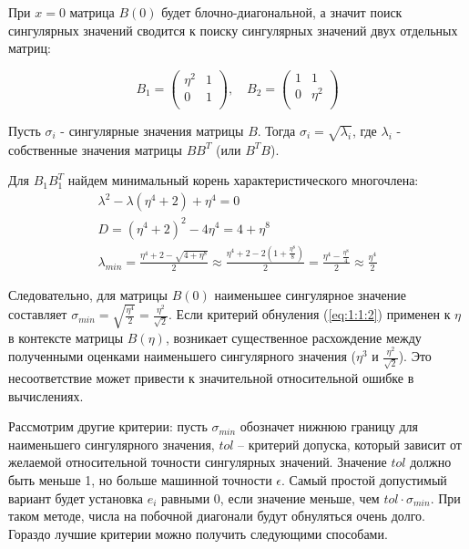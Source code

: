 При $x=0$ матрица $B(0)$ будет блочно-диагональной, а значит поиск сингулярных значений сводится к поиску сингулярных значений двух отдельных матриц:

\begin{equation*}
B_1=\begin{pmatrix}
\eta^2&1\\
0&1\\
\end{pmatrix},
\quad
B_2=\begin{pmatrix}
1&1\\
0&\eta^2\\
\end{pmatrix}
\end{equation*}

\begin{note}
    Пусть $\sigma_i$ - сингулярные значения матрицы $B$. Тогда $\sigma_i = \sqrt{\lambda_i}$, где $\lambda_i$ - собственные значения матрицы $BB^T$ (или $B^TB$). 
\end{note}

Для $B_1B_1^T$ найдем минимальный корень характеристического многочлена:
\begin{equation*}
\begin{gathered}
\lambda^2-\lambda(\eta^4+2)+\eta^4=0 \\
D = (\eta^4+2)^2-4\eta^4 = 4+\eta^8 \\
\lambda_{min} = \frac{\eta^4+2-\sqrt{4+\eta^8}}{2}
\approx \frac{\eta^4+2-2(1+\frac{\eta^8}{8})}{2} = \frac{\eta^4-\frac{\eta^8}{4}}{2} \approx \frac{\eta^4}{2}
\end{gathered}
\end{equation*}

Следовательно, для матрицы $B(0)$ наименьшее сингулярное значение составляет $\sigma_{min} = \sqrt{\frac{\eta^4}{2}} = \frac{\eta^2}{\sqrt{2}}$. Если критерий обнуления (\ref{eq:1:1:2}) применен к $\eta$ в контексте матрицы $B(\eta)$, возникает существенное расхождение между полученными оценками наименьшего сингулярного значения ($\eta^3$ и $\frac{\eta^2}{\sqrt{2}}$). Это несоответствие может привести к значительной относительной ошибке в вычислениях.


Рассмотрим другие критерии: пусть $\sigma_{min}$ обозначет нижнюю границу для наименьшего сингулярного значения, $tol$ \--- критерий допуска, который зависит от желаемой относительной точности сингулярных значений. Значение $tol$ должно быть меньше 1, но больше машинной точности $\epsilon$. Самый простой допустимый вариант будет установка $e_i$ равными 0, если значение меньше, чем $tol\cdot\sigma_{min}$. При таком методе, числа на побочной диагонали будут обнуляться очень долго. Гораздо лучшие критерии можно получить следующими способами.


